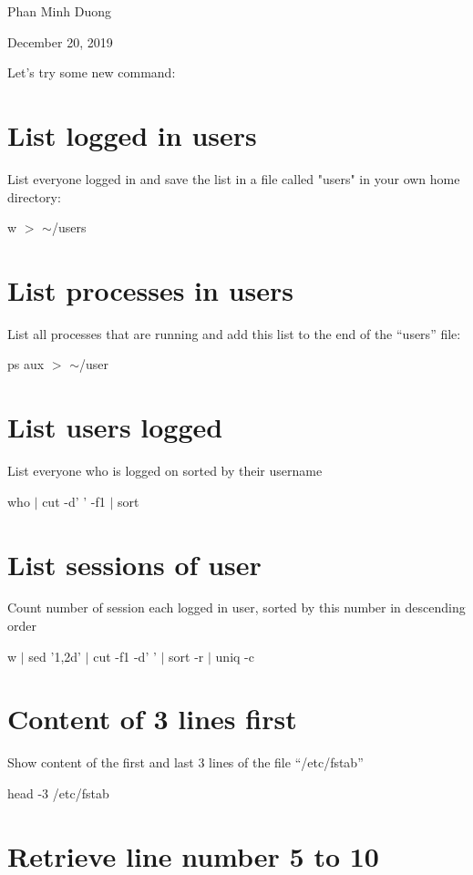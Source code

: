 \documentclass[article, paper=a4, fontsize=11pt]{scrartcl}
\begin{document}
\begin{center}
Phan Minh Duong
\end{center}
\begin{center}
December 20, 2019
\end{center}

Let's try some new command:

\section{List logged in users}

List everyone logged in and save the list in a file called "users" in your own home directory:

w $>$ $ \sim$/users

\section{List processes in users}

List all processes that are running and add this list to the end of the “users” file:

ps  aux $>$ $ \sim$/user

\section{List users logged }

List everyone who is logged on sorted by their username

who $\mid$  cut -d' ' -f1 $\mid$ sort

\section{List sessions of user }

Count number of session each logged in user, sorted by this number in descending order

w $\mid$ sed '1,2d' $\mid$ cut -f1 -d' ' $\mid$ sort -r $\mid$ uniq -c

\section{Content of 3 lines first}

Show content of the first and last 3 lines of the file “/etc/fstab”

head -3 /etc/fstab

\section{Retrieve line number 5 to 10}
\end{document}
